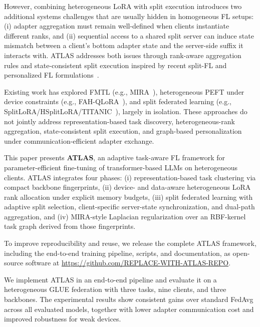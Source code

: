 \documentclass[conference]{IEEEtran}
\begin{document}
However, combining heterogeneous LoRA with split execution introduces two additional systems challenges that are usually hidden in homogeneous FL setups: (i) adapter aggregation must remain well-defined when clients instantiate different ranks, and (ii) sequential access to a shared split server can induce state mismatch between a client's bottom adapter state and the server-side suffix it interacts with. ATLAS addresses both issues through rank-aware aggregation rules and state-consistent split execution inspired by recent split-FL and personalized FL formulations~\cite{hsplitlora,splitfed,scaffold,pfedme,fednova}.

Existing work has explored FMTL (e.g., MIRA~\cite{mira}), heterogeneous PEFT under device constraints (e.g., FAH-QLoRA~\cite{fah_qlora}), and split federated learning (e.g., SplitLoRA/HSplitLoRA/TITANIC~\cite{splitlora,hsplitlora,titanic}), largely in isolation. These approaches do not jointly address representation-based task discovery, heterogeneous-rank aggregation, state-consistent split execution, and graph-based personalization under communication-efficient adapter exchange.

This paper presents \textbf{ATLAS}, an adaptive task-aware FL framework for parameter-efficient fine-tuning of transformer-based LLMs on heterogeneous clients. ATLAS integrates four phases: (i) representation-based task clustering via compact backbone fingerprints, (ii) device- and data-aware heterogeneous LoRA rank allocation under explicit memory budgets, (iii) split federated learning with adaptive split selection, client-specific server-state synchronization, and dual-path aggregation, and (iv) MIRA-style Laplacian regularization over an RBF-kernel task graph derived from those fingerprints.

To improve reproducibility and reuse, we release the complete ATLAS framework, including the end-to-end training pipeline, scripts, and documentation, as open-source software at \url{https://github.com/REPLACE-WITH-ATLAS-REPO}.

We implement ATLAS in an end-to-end pipeline and evaluate it on a heterogeneous GLUE federation with three tasks, nine clients, and three backbones. The experimental results show consistent gains over standard FedAvg across all evaluated models, together with lower adapter communication cost and improved robustness for weak devices.
\end{document}
